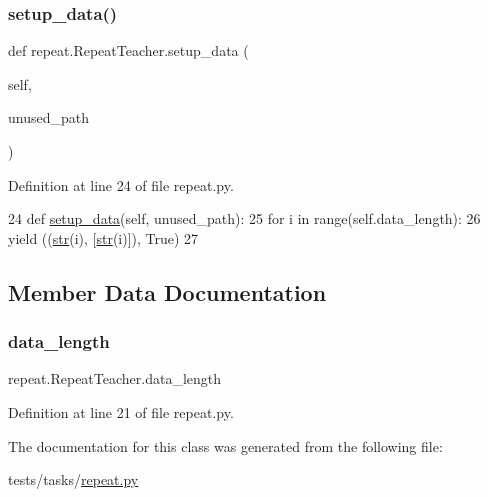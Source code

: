 \subsubsection{\texorpdfstring{setup\+\_\+data()}{setup\_data()}}
{\footnotesize\ttfamily def repeat.\+Repeat\+Teacher.\+setup\+\_\+data (\begin{DoxyParamCaption}\item[{}]{self,  }\item[{}]{unused\+\_\+path }\end{DoxyParamCaption})}



Definition at line 24 of file repeat.\+py.


\begin{DoxyCode}
24     \textcolor{keyword}{def }\hyperlink{namespaceparlai_1_1tasks_1_1aqua_1_1agents_a2d4e9f4e80d4edc0646c7e3d52be9f25}{setup\_data}(self, unused\_path):
25         \textcolor{keywordflow}{for} i \textcolor{keywordflow}{in} range(self.data\_length):
26             \textcolor{keywordflow}{yield} ((\hyperlink{namespacegenerate__task__READMEs_a5b88452ffb87b78c8c85ececebafc09f}{str}(i), [\hyperlink{namespacegenerate__task__READMEs_a5b88452ffb87b78c8c85ececebafc09f}{str}(i)]), \textcolor{keyword}{True})
27 
\end{DoxyCode}


\subsection{Member Data Documentation}
\mbox{\label{classrepeat_1_1RepeatTeacher_abc46f01649c8af2c60124d7946a95e98}} 
\subsubsection{\texorpdfstring{data\+\_\+length}{data\_length}}
{\footnotesize\ttfamily repeat.\+Repeat\+Teacher.\+data\+\_\+length}



Definition at line 21 of file repeat.\+py.



The documentation for this class was generated from the following file\+:\begin{DoxyCompactItemize}
\item 
tests/tasks/\hyperlink{repeat_8py}{repeat.\+py}\end{DoxyCompactItemize}

